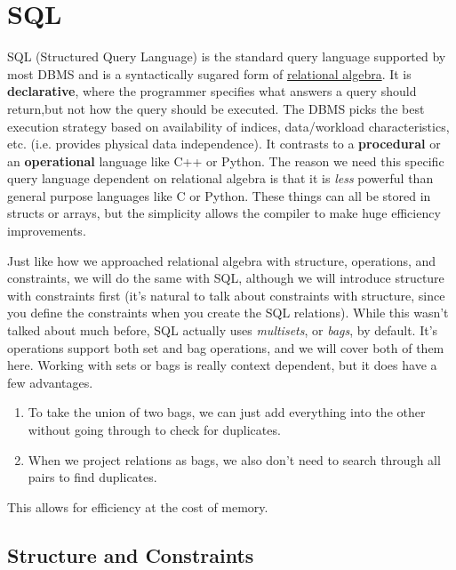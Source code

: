 \section{SQL} 

  SQL (Structured Query Language) is the standard query language supported by most DBMS and is a syntactically sugared form of \hyperref[def:relational-algebra]{relational algebra}. It is \textbf{declarative}, where the programmer specifies what answers a query should return,but not how the query should be executed. The DBMS picks the best execution strategy based on availability of indices, data/workload characteristics, etc. (i.e. provides physical data independence). It contrasts to a \textbf{procedural} or an \textbf{operational} language like C++ or Python. The reason we need this specific query language dependent on relational algebra is that it is \textit{less} powerful than general purpose languages like C or Python. These things can all be stored in structs or arrays, but the simplicity allows the compiler to make huge efficiency improvements. 

  Just like how we approached relational algebra with structure, operations, and constraints, we will do the same with SQL, although we will introduce structure with constraints first (it's natural to talk about constraints with structure, since you define the constraints when you create the SQL relations). While this wasn't talked about much before, SQL actually uses \textit{multisets}, or \textit{bags}, by default. It's operations support both set and bag operations, and we will cover both of them here. Working with sets or bags is really context dependent, but it does have a few advantages. 
  \begin{enumerate}
    \item To take the union of two bags, we can just add everything into the other without going through to check for duplicates. 
    \item When we project relations as bags, we also don't need to search through all pairs to find duplicates. 
  \end{enumerate}
  This allows for efficiency at the cost of memory. 

\subsection{Structure and Constraints}

